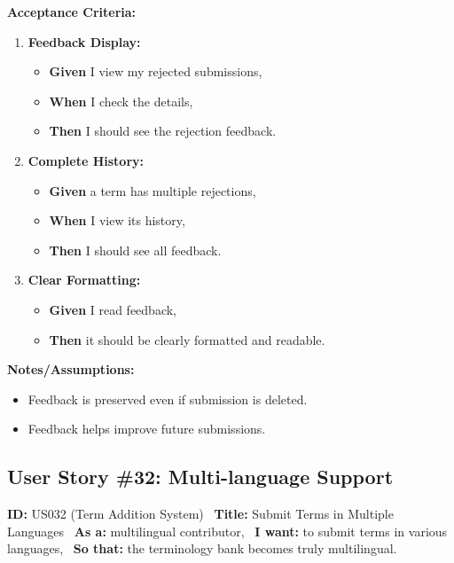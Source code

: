 \documentclass[12pt]{article}
\begin{document}
\vspace{1em}
\textbf{Acceptance Criteria:}
\begin{enumerate}
\item \textbf{Feedback Display:}
\begin{itemize}
\item \textbf{Given} I view my rejected submissions,
\item \textbf{When} I check the details,
\item \textbf{Then} I should see the rejection feedback.
\end{itemize}

\item \textbf{Complete History:}
\begin{itemize}
    \item \textbf{Given} a term has multiple rejections,
    \item \textbf{When} I view its history,
    \item \textbf{Then} I should see all feedback.
\end{itemize}

\item \textbf{Clear Formatting:}
\begin{itemize}
    \item \textbf{Given} I read feedback,
    \item \textbf{Then} it should be clearly formatted and readable.
\end{itemize}
\end{enumerate}

\vspace{1em}
\textbf{Notes/Assumptions:}
\begin{itemize}
\item Feedback is preserved even if submission is deleted.
\item Feedback helps improve future submissions.
\end{itemize}

\subsection{User Story \#32: Multi-language Support}
\textbf{ID:} US032 (Term Addition System) \
\textbf{Title:} Submit Terms in Multiple Languages \
\textbf{As a:} multilingual contributor, \
\textbf{I want:} to submit terms in various languages, \
\textbf{So that:} the terminology bank becomes truly multilingual.
\end{document}
